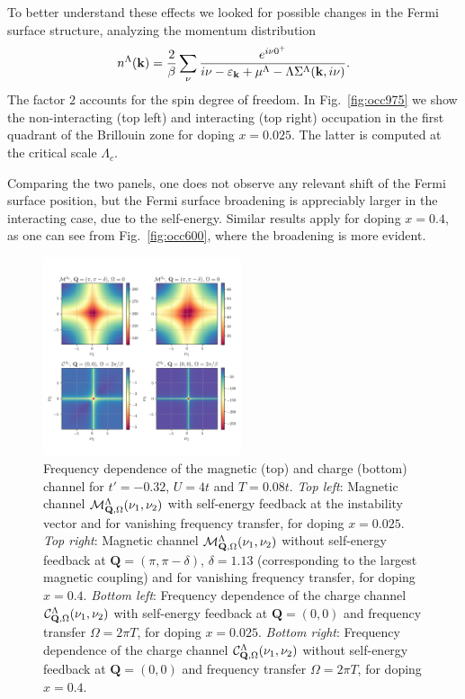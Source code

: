 To better understand these effects we looked for possible changes in the Fermi surface structure, analyzing the momentum distribution
%
\begin{equation}
 n^{\Lambda}(\mathbf{k})  = \frac{2}{\beta} \sum_{\nu}\frac{e^{i\nu 0^+}}{i\nu-\varepsilon_{\mathbf{k}}+\mu^\Lambda-\Lambda\Sigma^\Lambda(\mathbf{k},i\nu)}.
 \label{eq:occ} 
\end{equation}
%
The factor $2$ accounts for the spin degree of freedom. 
In Fig.~\ref{fig:occ975} we show the non-interacting (top left) and interacting (top right) occupation in the first quadrant of the Brillouin zone for doping $x=0.025$.
The latter is computed at the critical scale $\Lambda_c$. 

Comparing the two panels, one does not observe any relevant shift of the Fermi surface position, but the Fermi surface broadening is appreciably larger in the interacting case, due to the self-energy.
Similar results apply for doping $x=0.4$, as one can see from Fig.~\ref{fig:occ600}, where the broadening is more evident.  

\begin{figure}
\hspace*{-1.0cm}
\includegraphics[width=0.52\textwidth]{images/Phi_color_all.png}
\caption{Frequency dependence of the magnetic (top) and charge (bottom) channel for $t'=-0.32$, $U=4t$ and $T=0.08t$.
\emph{Top left}:
Magnetic channel $\mathcal{M}^\Lambda_{\mathbf{Q},\Omega}(\nu_1,\nu_2)$ with self-energy feedback at the instability vector and for vanishing frequency transfer, for doping $x=0.025$.
\emph{Top right}:
Magnetic channel $\mathcal{M}^\Lambda_{\mathbf{Q},\Omega}(\nu_1,\nu_2)$ without self-energy feedback at $\mathbf{Q}=(\pi,\pi-\delta)$, $\delta=1.13$ (corresponding to the largest magnetic coupling) and for vanishing frequency transfer, for doping $x=0.4$.
\emph{Bottom left}:
Frequency dependence of the charge channel $\mathcal{C}^\Lambda_{\mathbf{Q},\Omega}(\nu_1,\nu_2)$ with self-energy feedback at $\mathbf{Q}=(0,0)$ and frequency transfer $\Omega=2\pi T$, for doping $x=0.025$.
\emph{Bottom right}:
Frequency dependence of the charge channel $\mathcal{C}^\Lambda_{\mathbf{Q},\Omega}(\nu_1,\nu_2)$ without self-energy feedback at $\mathbf{Q}=(0,0)$ and frequency transfer $\Omega=2\pi T$, for doping $x=0.4$.
}  
\label{fig:freqplot} 
\end{figure}

